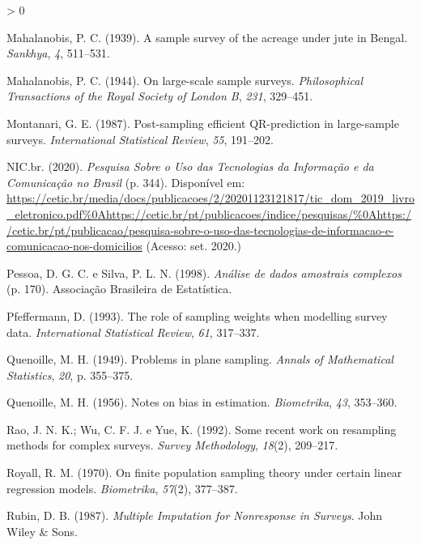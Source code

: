 \documentclass[
  12pt,
  brazilian,
]{book}
\newlength{\cslhangindent}
\newenvironment{CSLReferences}[2] %
 {%
  \setlength{\parindent}{0pt}
  \ifodd #1 \everypar{\setlength{\hangindent}{\cslhangindent}}\ignorespaces\fi
  \ifnum #2 > 0
  \setlength{\parskip}{#2\baselineskip}
  \fi
 }%
 {}
\theoremstyle{definition}
\theoremstyle{definition}
\theoremstyle{definition}
\theoremstyle{definition}
\theoremstyle{remark}
\begin{document}
\begin{CSLReferences}{1}{0}
\leavevmode\hypertarget{ref-Mahala1939}{}%
Mahalanobis, P. C. (1939). A sample survey of the acreage under jute in Bengal. \emph{Sankhya}, \emph{4}, 511--531.

\leavevmode\hypertarget{ref-Mahala1944}{}%
Mahalanobis, P. C. (1944). On large-scale sample surveys. \emph{Philosophical Transactions of the Royal Society of London B}, \emph{231}, 329--451.

\leavevmode\hypertarget{ref-Mont87}{}%
Montanari, G. E. (1987). Post-sampling efficient {QR-prediction} in large-sample surveys. \emph{International Statistical Review}, \emph{55}, 191--202.

\leavevmode\hypertarget{ref-NICbr2020a}{}%
NIC.br. (2020). \emph{{Pesquisa Sobre o Uso das Tecnologias da Informa{ç}{ã}o e da Comunica{ç}{ã}o no Brasil}} (p. 344). Disponível em: \url{https://cetic.br/media/docs/publicacoes/2/20201123121817/tic_dom_2019_livro_eletronico.pdf\%0Ahttps://cetic.br/pt/publicacoes/indice/pesquisas/\%0Ahttps://cetic.br/pt/publicacao/pesquisa-sobre-o-uso-das-tecnologias-de-informacao-e-comunicacao-nos-domicilios} (Acesso: set. 2020.)

\leavevmode\hypertarget{ref-Pessoa1998}{}%
Pessoa, D. G. C. e Silva, P. L. N. (1998). \emph{{An{á}lise de dados amostrais complexos}} (p. 170). Associa{ç}{ã}o Brasileira de Estat{í}stica.

\leavevmode\hypertarget{ref-Pfeff}{}%
Pfeffermann, D. (1993). The role of sampling weights when modelling survey data. \emph{International Statistical Review}, \emph{61}, 317--337.

\leavevmode\hypertarget{ref-Queno49}{}%
Quenoille, M. H. (1949). Problems in plane sampling. \emph{Annals of Mathematical Statistics}, \emph{20}, p. 355--375.

\leavevmode\hypertarget{ref-Queno56}{}%
Quenoille, M. H. (1956). Notes on bias in estimation. \emph{Biometrika}, \emph{43}, 353--360.

\leavevmode\hypertarget{ref-Rao1992}{}%
Rao, J. N. K.; Wu, C. F. J. e Yue, K. (1992). {Some recent work on resampling methods for complex surveys}. \emph{Survey Methodology}, \emph{18}(2), 209--217.

\leavevmode\hypertarget{ref-royall1970}{}%
Royall, R. M. (1970). On finite population sampling theory under certain linear regression models. \emph{Biometrika}, \emph{57}(2), 377--387.

\leavevmode\hypertarget{ref-Rubin87}{}%
Rubin, D. B. (1987). \emph{Multiple Imputation for Nonresponse in Surveys}. John Wiley \& Sons.


\end{CSLReferences}
\end{document}
